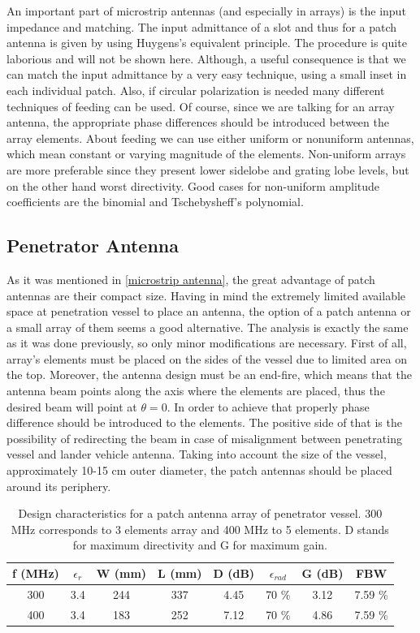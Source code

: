 \noindent
An important part of microstrip antennas (and especially in arrays) is the input impedance and matching. The input admittance of a slot and thus for a patch antenna is given by using Huygens's equivalent principle. The procedure is quite laborious and will not be shown here. Although, a useful consequence is that we can match the input admittance by a very easy technique, using a small inset in each individual patch. Also, if circular polarization is needed many different techniques of feeding can be used. Of course, since we are talking for an array antenna, the appropriate phase differences should be introduced between the array elements. About feeding we can use either uniform or nonuniform antennas, which mean constant or varying magnitude of the elements. Non-uniform arrays are more preferable since they present lower sidelobe and grating lobe levels, but on the other hand worst directivity. Good cases for non-uniform amplitude coefficients are the binomial and Tschebysheff's polynomial. 

\subsection{Penetrator Antenna}

As it was mentioned in \ref{microstrip antenna}, the great advantage of patch antennas are their compact size. Having in mind the extremely limited available space at penetration vessel to place an antenna, the option of a patch antenna or a small array of them seems a good alternative. The analysis is exactly the same as it was done previously, so only minor modifications are necessary. First of all, array's elements must be placed on the sides of the vessel due to limited area on the top. Moreover, the antenna design must be an end-fire, which means that the antenna beam points along the axis where the elements are placed, thus the desired beam will point at $\theta=0$. In order to achieve that properly phase difference should be introduced to the elements. The positive side of that is the possibility of redirecting the beam in case of misalignment between penetrating vessel and lander vehicle antenna. Taking into account the size of the vessel, approximately 10-15 cm outer diameter, the patch antennas should be placed around its periphery. 

\begin{table}[ht]
\centering
\begin{tabular}{| c | c | c | c | c | c | c | c |}
\hline
 \textbf{f (MHz)} & \textbf{$\epsilon_{r}$} & \textbf{W (mm)} & \textbf{L (mm)} & \textbf{D (dB)} & \textbf{$\epsilon_{rad}$} & \textbf{G (dB)} & FBW \\ 
 \hline
 300 & 3.4 & 244 & 337 & 4.45 & 70 \% & 3.12 & 7.59 \% \\
 \hline
 400 & 3.4 & 183 & 252 & 7.12 & 70 \% & 4.86 & 7.59 \% \\
 \hline
\end{tabular}
\caption{Design characteristics for a patch antenna array of penetrator vessel. 300 MHz corresponds to 3 elements array and 400 MHz to 5 elements. D stands for maximum directivity and G for maximum gain.}
\label{table: results_pen}
\end{table}

